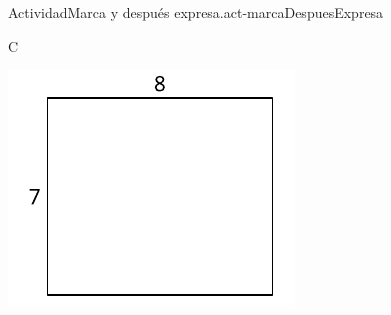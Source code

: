 \documentclass[14pt]{extarticle}
\begin{document}
\begin{activity}{Actividad}{Marca y después expresa.}{act-marcaDespuesExpresa}
\par\vspace{1cm}
C%
\par
\includegraphics[scale=1.2, max width=\linewidth]{external/svg-source/tikz-file-153086.pdf}
\par\vspace{1cm}
\begin{image}{0}{1}{0}{}%

\end{image}
\end{activity}
\end{document}

